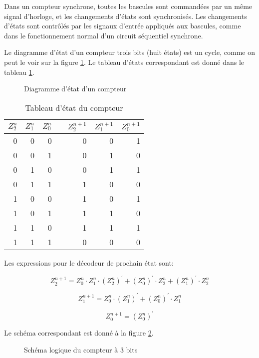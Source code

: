 \documentclass[11pt]{article}
\begin{document}
Dans un compteur synchrone, toutes les bascules sont commandées par un
même signal d'horloge, et les changements d'états sont
synchronisés. Les changements d'états sont contrôlés par les signaux
d'entrée appliqués aux bascules, comme dans le fonctionnement normal
d'un circuit séquentiel synchrone.

Le diagramme d'état d'un compteur trois bits (huit états) est un
cycle, comme on peut le voir sur la figure \ref{fig:org4ef6b87}. Le tableau
d'états correspondant est donné dans le tableau \ref{tab:org3291b13}.


\begin{figure}[htbp]
\centering

\caption{\label{fig:org4ef6b87}Diagramme d'état d'un compteur}
\end{figure}

\begin{table}[htbp]
\caption{\label{tab:org3291b13}Tableau d'état du compteur}
\centering
\begin{tabular}{rrrlrrr}
\(Z_2^n\) & \(Z_1^n\) & \(Z_0^n\) &  & \(Z_2^{n+1}\) & \(Z_1^{n+1}\) & \(Z_0^{n+1}\)\\
\hline
0 & 0 & 0 &  & 0 & 0 & 1\\
0 & 0 & 1 &  & 0 & 1 & 0\\
0 & 1 & 0 &  & 0 & 1 & 1\\
0 & 1 & 1 &  & 1 & 0 & 0\\
1 & 0 & 0 &  & 1 & 0 & 1\\
1 & 0 & 1 &  & 1 & 1 & 0\\
1 & 1 & 0 &  & 1 & 1 & 1\\
1 & 1 & 1 &  & 0 & 0 & 0\\
\end{tabular}
\end{table}

Les expressions pour le décodeur de prochain état sont: 

$$  Z_2^{n+1} = Z_0^n \cdot Z_1^n \cdot (Z_2^{n})^\prime + (Z_0^{n})^\prime \cdot Z_2^n + (Z_1^{n})^\prime \cdot Z_2^n $$

$$  Z_1^{n+1} = Z_0^{n} \cdot (Z_1^{n})^\prime + (Z_0^{n})^\prime \cdot Z_1^n $$

$$  Z_0^{n+1} = (Z_0^{n})^\prime $$


Le schéma correspondant est donné à la figure \ref{fig:org1752b0f}.

\begin{figure}[htbp]
\centering

\caption{\label{fig:org1752b0f}Schéma logique du compteur à 3 bits}
\end{figure}
\end{document}
